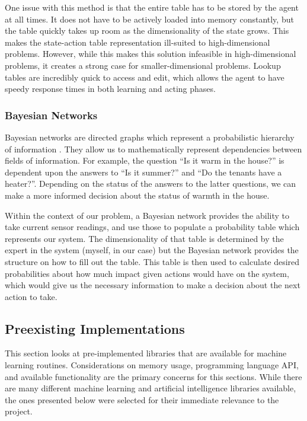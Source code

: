 \documentclass[draftclsnofoot,onecolumn,letterpaper,10pt]{IEEEtran}
\begin{document}
One issue with this method is that the entire table has to be stored by the agent at all times.
It does not have to be actively loaded into memory constantly, but the table quickly takes up room as the dimensionality of the state grows.
This makes the state-action table representation ill-suited to high-dimensional problems.
However, while this makes this solution infeasible in high-dimensional problems, it creates a strong case for smaller-dimensional problems.
Lookup tables are incredibly quick to access and edit, which allows the agent to have speedy response times in both learning and acting phases.

\subsubsection{Bayesian Networks}
Bayesian networks are directed graphs which represent a probabilistic hierarchy of information \cite{RussellNorvig}.
They allow us to mathematically represent dependencies between fields of information.
For example, the question ``Is it warm in the house?'' is dependent upon the answers to ``Is it summer?'' and ``Do the tenants have a heater?''.
Depending on the status of the answers to the latter questions, we can make a more informed decision about the status of warmth in the house.

Within the context of our problem, a Bayesian network provides the ability to take current sensor readings, and use those to populate a probability table which represents our system.
The dimensionality of that table is determined by the expert in the system (myself, in our case) but the Bayesian network provides the structure on how to fill out the table.
This table is then used to calculate desired probabilities about how much impact given actions would have on the system, which would give us the necessary information to make a decision about the next action to take.

\subsection{Preexisting Implementations}
This section looks at pre-implemented libraries that are available for machine learning routines.
Considerations on memory usage, programming language API, and available functionality are the primary concerns for this sections.
While there are many different machine learning and artificial intelligence libraries available, the ones presented below were selected for their immediate relevance to the project.
\end{document}
